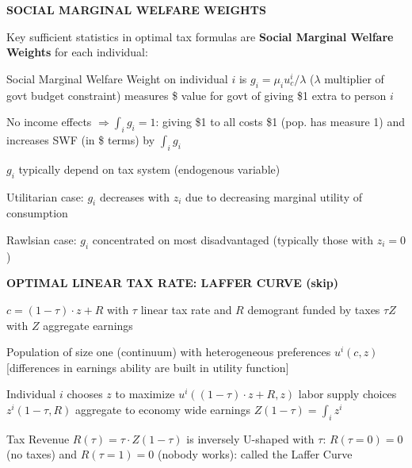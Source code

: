 \documentclass[landscape]{slides}
\begin{document}
\begin{slide}
\begin{center}
{\bf SOCIAL MARGINAL WELFARE WEIGHTS}
\end{center}

Key sufficient statistics in optimal tax formulas are \textbf{Social Marginal Welfare Weights} for each
individual: 

Social Marginal Welfare Weight on individual $i$ is $g_i = \mu_i u^i_c / \lambda$ ($\lambda$ multiplier of govt budget constraint) measures \$ value for
govt of giving \$1 extra to person $i$ 

No income effects $\Rightarrow \int_i g_i =1$: giving \$1 to all costs \$1 (pop. has measure 1)
and increases SWF (in \$ terms) by $\int_i g_i$

$g_i$ typically depend on tax system (endogenous variable)

Utilitarian case: $g_i$ decreases with $z_i$ due to decreasing marginal utility of consumption 

Rawlsian case: $g_i$ concentrated on most disadvantaged (typically those with $z_i=0$)

\end{slide}

\begin{slide}

\end{slide}


\begin{slide}
\begin{center}
{\bf OPTIMAL LINEAR TAX RATE: LAFFER CURVE (skip)}
\end{center}
$c=(1-\tau)\cdot z + R$ with $\tau$ linear tax rate and $R$ demogrant funded
by taxes $\tau Z$ with $Z$ aggregate earnings

Population of size one (continuum) with heterogeneous preferences $u^i(c,z)$
[differences in earnings ability are built in utility function]

Individual $i$ chooses $z$ to maximize $u^i((1-\tau)\cdot z + R,z)$
labor supply choices $z^i(1-\tau,R)$ aggregate to economy wide earnings
$Z(1-\tau) = \int_i z^i $

Tax Revenue $R(\tau)=\tau \cdot Z(1-\tau)$ is inversely U-shaped
with $\tau$: $R(\tau=0)=0$ (no taxes) and $R(\tau=1)=0$ (nobody
works): called the Laffer Curve

\end{slide}
\end{document}
